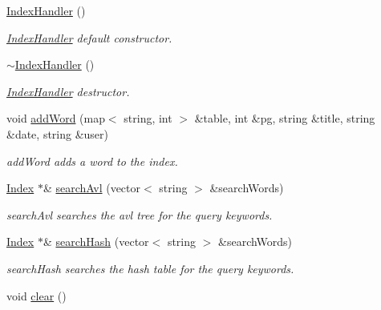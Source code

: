 \begin{DoxyCompactItemize}
\item 
\hypertarget{class_index_handler_a27748387661142a2eb545be6f0499996}{\hyperlink{class_index_handler_a27748387661142a2eb545be6f0499996}{Index\-Handler} ()}\label{class_index_handler_a27748387661142a2eb545be6f0499996}

\begin{DoxyCompactList}\small\item\em \hyperlink{class_index_handler}{Index\-Handler} default constructor. \end{DoxyCompactList}\item 
\hypertarget{class_index_handler_ad787ca8cf83345ecfe332d2c3b8f8009}{\hyperlink{class_index_handler_ad787ca8cf83345ecfe332d2c3b8f8009}{$\sim$\-Index\-Handler} ()}\label{class_index_handler_ad787ca8cf83345ecfe332d2c3b8f8009}

\begin{DoxyCompactList}\small\item\em \hyperlink{class_index_handler}{Index\-Handler} destructor. \end{DoxyCompactList}\item 
void \hyperlink{class_index_handler_acbad99b5b0887fe776981d85529844d6}{add\-Word} (map$<$ string, int $>$ \&table, int \&pg, string \&title, string \&date, string \&user)
\begin{DoxyCompactList}\small\item\em add\-Word adds a word to the index. \end{DoxyCompactList}\item 
\hyperlink{class_index}{Index} $\ast$\& \hyperlink{class_index_handler_a0e010188cadc61017f9ada638842257f}{search\-Avl} (vector$<$ string $>$ \&search\-Words)
\begin{DoxyCompactList}\small\item\em search\-Avl searches the avl tree for the query keywords. \end{DoxyCompactList}\item 
\hyperlink{class_index}{Index} $\ast$\& \hyperlink{class_index_handler_a9549ae56231952fb0ff5883734e6f013}{search\-Hash} (vector$<$ string $>$ \&search\-Words)
\begin{DoxyCompactList}\small\item\em search\-Hash searches the hash table for the query keywords. \end{DoxyCompactList}\item 
\hypertarget{class_index_handler_a4cdb58399788cff4a00ef065b805952a}{void \hyperlink{class_index_handler_a4cdb58399788cff4a00ef065b805952a}{clear} ()}\label{class_index_handler_a4cdb58399788cff4a00ef065b805952a}


\end{DoxyCompactItemize}
